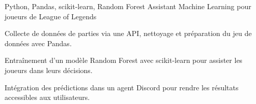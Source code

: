 
\begin{cventries}
  \cventry
    {Python, Pandas, scikit-learn, Random Forest}
    {Assistant Machine Learning pour joueurs de League of Legends}
    {}
    {}
    {
      \begin{cvitems}
        \item {Collecte de données de parties via une API, nettoyage et préparation du jeu de données avec Pandas.}
        \item {Entraînement d’un modèle Random Forest avec scikit-learn pour assister les joueurs dans leurs décisions.}
        \item {Intégration des prédictions dans un agent Discord pour rendre les résultats accessibles aux utilisateurs.}
      \end{cvitems}
    }
\end{cventries}
